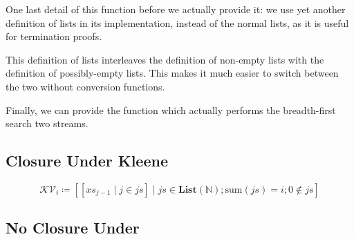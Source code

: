 One last detail of this function before we actually provide it: we use yet
another definition of lists in its implementation, instead of the normal lists,
as it is useful for termination proofs.
\begin{agdalisting*}
  \begin{multicols}{2} \centering
     \columnbreak
  \end{multicols}
\end{agdalisting*}
This definition of lists interleaves the definition of non-empty lists with the
definition of possibly-empty lists.
This makes it much easier to switch between the two without conversion
functions.

Finally, we can provide the function which actually performs the breadth-first
search two streams.
\begin{agdalisting*}
\end{agdalisting*}
\subsection{Closure Under Kleene}
\begin{agdalisting*}
\end{agdalisting*}
\begin{equation*}
  \mathcal{KV}_i \coloneqq \left[ \left[ \mathit{xs}_{j - 1} \mid j \in \mathit{js} \right] \mid \mathit{js} \in \mathbf{List}(\mathbb{N}) ; \text{sum}(\mathit{js}) = i ; 0 \notin \mathit{js}  \right]
\end{equation*}
\subsection{No Closure Under \AgdaDatatype{\(\Pi\)}}
\begin{agdalisting*}
\end{agdalisting*}



